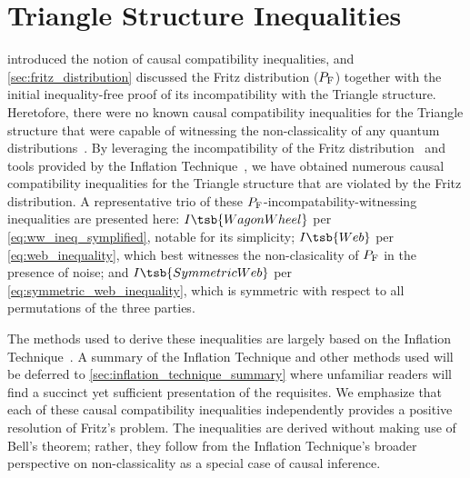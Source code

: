 \documentclass[aps, 10pt, english, twoside, pra, nofootinbib, tightenlines, longbibliography, superscriptaddress]{revtex4-1}
\begin{document}
    \section{Triangle Structure Inequalities}
    \label{sec:found_inequalities}

     introduced the notion of causal compatibility inequalities, and \cref{sec:fritz_distribution} discussed the Fritz distribution ($\prob[\fritz]$) together with the initial inequality-free proof of its incompatibility with the Triangle structure. Heretofore, there were no known causal compatibility inequalities for the Triangle structure that were capable of witnessing the non-classicality of any quantum distributions~\cite{Inflation}. By leveraging the incompatibility of the Fritz distribution~\cite{Fritz_2012} and tools provided by the Inflation Technique~\cite{Inflation}, we have obtained numerous causal compatibility inequalities for the Triangle structure that are violated by the Fritz distribution. A representative trio of these $\prob[\fritz]$-incompatability-witnessing inequalities are presented here: $I\tsb{WagonWheel}$ per \cref{eq:ww_ineq_symplified}, notable for its simplicity; $I\tsb{Web}$ per \cref{eq:web_inequality}, which best witnesses the non-clasicality of $\prob[\fritz]$ in the presence of noise; and $I\tsb{SymmetricWeb}$ per \cref{eq:symmetric_web_inequality}, which is symmetric with respect to all permutations of the three parties.

    The methods used to derive these inequalities are largely based on the Inflation Technique~\cite{Inflation}. A summary of the Inflation Technique and other methods used will be deferred to \cref{sec:inflation_technique_summary} where unfamiliar readers will find a succinct yet sufficient presentation of the requisites.
    We emphasize that each of these causal compatibility inequalities independently provides a positive resolution of Fritz's problem. The inequalities are derived without making use of Bell's theorem; rather, they follow from the Inflation Technique's broader perspective on non-classicality as a special case of causal inference.
\end{document}
